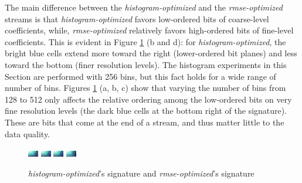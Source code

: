 The main difference between the \emph{histogram-optimized} and the \emph{rmse-optimized} streams is
that \emph{histogram-optimized} favors low-ordered bits of coarse-level coefficients, while,
\emph{rmse-optimized} relatively favors high-ordered bits of fine-level coefficients. This is
evident in Figure \ref{fig:histogram-signature-comparison} (b and d): for
\emph{histogram-optimized}, the bright blue cells extend more toward the right (lower-ordered bit
planes) and less toward the bottom (finer resolution levels). The histogram experiments in this
Section are performed with 256 bins, but this fact holds for a wide range of number of bins. Figures
\ref{fig:histogram-signature-comparison} (a, b, c) show that varying the number of bins from 128 to
512 only affects the relative ordering among the low-ordered bits on very fine resolution levels
(the dark blue cells at the bottom right of the signature). These are bits that come at the end of a
stream, and thus matter little to the data quality. 
 
\begin{figure}
	\centering
	{\includegraphics[width=0.24\linewidth]{img/histogram/sig-GREEDY-(histogram-128).png}}
	{\includegraphics[width=0.24\linewidth]{img/histogram/sig-GREEDY-(histogram-256).png}}
	{\includegraphics[width=0.24\linewidth]{img/histogram/sig-GREEDY-(histogram-512).png}}
	{\includegraphics[width=0.24\linewidth]{img/histogram/sig-GREEDY-(rmse).png}}
	\caption{\emph{histogram-optimized}'s signature and \emph{rmse-optimized}'s signature}
	\label{fig:histogram-signature-comparison}
\end{figure}

